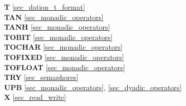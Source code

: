 {{\bf T} \ref{sec_dation_t_format}\\
{\bf TAN} \ref{sec_monadic_operators}\\
{\bf TANH} \ref{sec_monadic_operators}\\
{\bf TOBIT} \ref{sec_monadic_operators}\\
{\bf TOCHAR} \ref{sec_monadic_operators}\\
{\bf TOFIXED} \ref{sec_monadic_operators}\\
{\bf TOFLOAT} \ref{sec_monadic_operators}\\
{\bf TRY} \ref{sec_semaphores}\\
 
{\bf UPB} \ref{sec_monadic_operators}, \ref{sec_dyadic_operators}\\

{\bf X} \ref{sec_read_write}
}

%
%


\printindex
